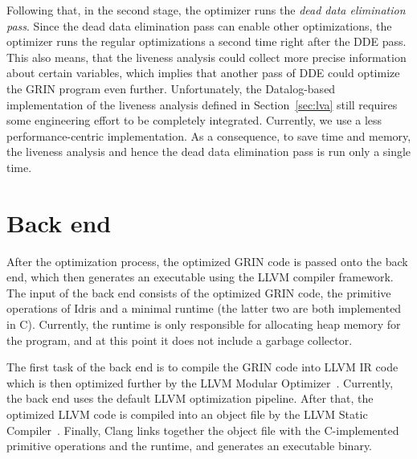 \documentclass[main.tex]{subfiles}
\begin{document}
	Following that, in the second stage, the optimizer runs the \textit{dead data elimination pass}. Since the dead data elimination pass can enable other optimizations, the optimizer runs the regular optimizations a second time right after the DDE pass. This also means, that the liveness analysis could collect more precise information about certain variables, which implies that another pass of DDE could optimize the GRIN program even further. Unfortunately, the Datalog-based implementation of the liveness analysis defined in Section~\ref{sec:lva} still requires some engineering effort to be completely integrated. Currently, we use a less performance-centric implementation. As a consequence, to save time and memory, the liveness analysis and hence the dead data elimination pass is run only a single time.
	
	\section{Back end}
	\label{subsec:llvm-back-end}
	
	After the optimization process, the optimized GRIN code is passed onto the back end, which then generates an executable using the LLVM compiler framework. The input of the back end consists of the optimized GRIN code, the primitive operations of Idris and a minimal runtime (the latter two are both implemented in C). Currently, the runtime is only responsible for allocating heap memory for the program, and at this point it does not include a garbage collector.
	
	The first task of the back end is to compile the GRIN code into LLVM IR code which is then optimized further by the LLVM Modular Optimizer~\cite{opt}. Currently, the back end uses the default LLVM optimization pipeline. After that, the optimized LLVM code is compiled into an object file by the LLVM Static Compiler~\cite{llc}. Finally, Clang links together the object file with the C-implemented primitive operations and the runtime, and generates an executable binary.
	
\end{document}
